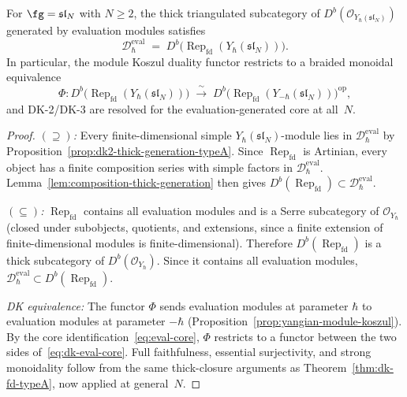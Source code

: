 \begin{theorem}
\label{thm:eval-core-identification}
For $\fg = \mathfrak{sl}_N$ with $N \ge 2$, the thick triangulated
subcategory of $D^b(\mathcal{O}_{Y_\hbar(\mathfrak{sl}_N)})$
generated by evaluation modules satisfies
\begin{equation}\label{eq:eval-core}
\mathcal{D}_\hbar^{\mathrm{eval}}
\;=\; D^b\bigl(\operatorname{Rep}_{\mathrm{fd}}
  (Y_\hbar(\mathfrak{sl}_N))\bigr).
\end{equation}
In particular, the module Koszul duality functor restricts to a
braided monoidal equivalence
\begin{equation}\label{eq:dk-eval-core}
\Phi\colon
D^b\bigl(\operatorname{Rep}_{\mathrm{fd}}(Y_\hbar(\mathfrak{sl}_N))\bigr)
\;\xrightarrow{\;\sim\;}\;
D^b\bigl(\operatorname{Rep}_{\mathrm{fd}}
  (Y_{-\hbar}(\mathfrak{sl}_N))\bigr)^{\mathrm{op}},
\end{equation}
and DK-2/DK-3 are resolved for the evaluation-generated core
at all~$N$.
\end{theorem}

\begin{proof}
\emph{$(\supseteq)$:}
Every finite-dimensional simple $Y_\hbar(\mathfrak{sl}_N)$-module
lies in $\mathcal{D}_\hbar^{\mathrm{eval}}$ by
Proposition~\ref{prop:dk2-thick-generation-typeA}.
Since $\operatorname{Rep}_{\mathrm{fd}}$ is Artinian, every
object has a finite composition series with simple factors in
$\mathcal{D}_\hbar^{\mathrm{eval}}$.
Lemma~\ref{lem:composition-thick-generation} then gives
$D^b(\operatorname{Rep}_{\mathrm{fd}}) \subset
\mathcal{D}_\hbar^{\mathrm{eval}}$.

\emph{$(\subseteq)$:}
$\operatorname{Rep}_{\mathrm{fd}}$ contains all evaluation modules
and is a Serre subcategory of $\mathcal{O}_{Y_\hbar}$ (closed under
subobjects, quotients, and extensions, since a finite extension of
finite-dimensional modules is finite-dimensional).  Therefore
$D^b(\operatorname{Rep}_{\mathrm{fd}})$ is a thick subcategory of
$D^b(\mathcal{O}_{Y_\hbar})$.  Since it contains all evaluation
modules, $\mathcal{D}_\hbar^{\mathrm{eval}} \subset
D^b(\operatorname{Rep}_{\mathrm{fd}})$.

\emph{DK equivalence:}
The functor $\Phi$ sends evaluation modules at parameter
$\hbar$ to evaluation modules at parameter $-\hbar$
(Proposition~\ref{prop:yangian-module-koszul}).  By the core
identification~\eqref{eq:eval-core}, $\Phi$ restricts to a functor
between the two sides of~\eqref{eq:dk-eval-core}.
Full faithfulness, essential surjectivity, and strong monoidality
follow from the same thick-closure arguments as
Theorem~\ref{thm:dk-fd-typeA}, now applied at general~$N$.
\end{proof}

